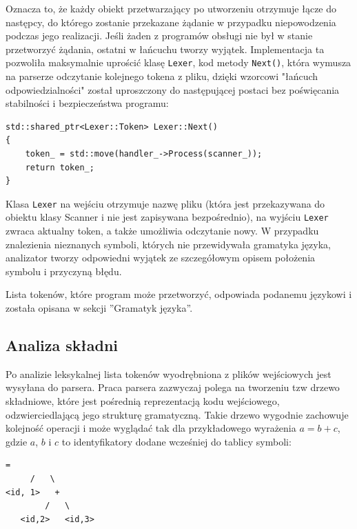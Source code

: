 Oznacza to, że każdy obiekt przetwarzający po utworzeniu otrzymuje łącze do następcy, do którego zostanie przekazane żądanie w przypadku niepowodzenia podczas jego realizacji. Jeśli żaden z programów obsługi nie był w stanie przetworzyć żądania, ostatni w łańcuchu tworzy wyjątek. Implementacja ta pozwoliła maksymalnie uprościć klasę \texttt{Lexer}, kod metody \texttt{Next()}, która wymusza na parserze odczytanie kolejnego tokena z pliku, dzięki wzorcowi "łańcuch odpowiedzialności" \cite{cor} został uproszczony do następującej postaci bez poświęcania stabilności i bezpieczeństwa programu:

\begin{lstlisting}[label=list:scanner,caption=Metoda Lexer::Next(),basicstyle=\footnotesize\ttfamily]
std::shared_ptr<Lexer::Token> Lexer::Next()
{
    token_ = std::move(handler_->Process(scanner_));
    return token_;
}
\end{lstlisting}

Klasa \texttt{Lexer} na wejściu otrzymuje nazwę pliku (która jest przekazywana do obiektu klasy Scanner i nie jest zapisywana bezpośrednio), na wyjściu \texttt{Lexer} zwraca aktualny token, a także umożliwia odczytanie nowy. W przypadku znalezienia nieznanych symboli, których nie przewidywała gramatyka języka, analizator tworzy odpowiedni wyjątek ze szczegółowym opisem położenia symbolu i przyczyną błędu.

Lista tokenów, które program może przetworzyć, odpowiada podanemu językowi i została opisana w sekcji ''Gramatyk języka''.

\subsection{Analiza składni}

Po analizie leksykalnej lista tokenów wyodrębniona z plików wejściowych jest wysyłana do parsera. Praca parsera zazwyczaj polega na tworzeniu tzw drzewo składniowe, które jest pośrednią reprezentacją kodu wejściowego, odzwierciedlającą jego strukturę gramatyczną. Takie drzewo wygodnie zachowuje kolejność operacji i może wyglądać tak dla przykładowego wyrażenia $a = b + c$, gdzie $a$, $b$ i $c$ to identyfikatory dodane wcześniej do tablicy symboli:

\begin{lstlisting}[label=list:syntax_tree,caption=Struktura gramatyczna przykładowego wyrażenia,basicstyle=\footnotesize\ttfamily]
       =
     /	 \
<id, 1>   +
        /   \
   <id,2>   <id,3>
\end{lstlisting}

